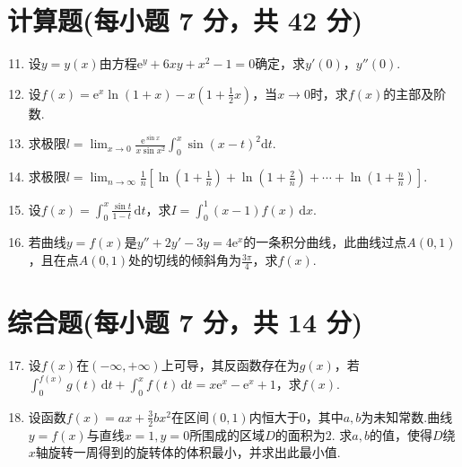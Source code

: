 \documentclass[../main.tex]{subfiles}
\begin{document}
\section{计算题(每小题 7 分，共 42 分)}
\begin{enumerate}
    \setcounter{enumi}{10}
    \item 设$y=y(x)$由方程$\mathrm{e}^{y}+6xy+x^{2}-1=0$确定，求$y'(0)$，$y''(0)$.
          \vspace{12em}

    \item 设$f(x)=\mathrm{e}^{x}\ln(1+x)-x\left(1+\frac{1}{2}x\right)$，当$x
              \to0$时，求$f(x)$的主部及阶数.
          \vspace{11em}

    \item 求极限$l=\lim_{x\to0}\frac{\mathrm{e}^{\sin x}}{x\sin x^{2}}\int_{0}
              ^{x}\sin(x-t)^{2} \mathrm{d}t$.
          \vspace{11em}

    \item 求极限$l=\lim_{n\to\infty}\frac{1}{n}\left[\ln\left(1+\frac{1}{n}\right
                  )+\ln\left(1+\frac{2}{n}\right)+\cdots+\ln\left(1+\frac{n}{n}\right)\right]$.
          \vspace{11em}

    \item 设$f(x)=\int_{0}^{x}\frac{\sin t}{1-t}\,\mathrm{d}t$，求$I=\int_{0}^{1}
              (x-1)f(x)\,\mathrm{d}x$.
          \vspace{11em}

    \item 若曲线$y=f(x)$是$y''+2y'-3y=4\mathrm{e}^{x}$的一条积分曲线，此曲线过点$A
              (0,1)$，且在点$A(0,1)$处的切线的倾斜角为$\frac{3\pi}{4}$，求$f(x)$.
          \vspace{11em}
\end{enumerate}

\section{综合题(每小题 7 分，共 14 分)}
\begin{enumerate}
    \setcounter{enumi}{16}
    \item 设$f(x)$在$(-\infty,+\infty)$上可导，其反函数存在为$g(x)$，若$\int
              _{0}^{f(x)}g(t)\,\mathrm{d}t+\int_{0}^{x}f(t)\,\mathrm{d}t=x\mathrm{e}^{x}-\mathrm{e}
              ^{x}+1$，求$f(x)$.
          \vspace{9em}

    \item 设函数$f(x)=ax+\frac{3}{2}bx^{2}$在区间$(0,1)$内恒大于$0$，其中$a,
              b$为未知常数.曲线$y=f(x)$与直线$x=1,y=0$所围成的区域$D$的面积为$2$. 求$a,b$的值，使得$D$绕$x$轴旋转一周得到的旋转体的体积最小，并求出此最小值.
          \vspace{9em}
\end{enumerate}
\end{document}
